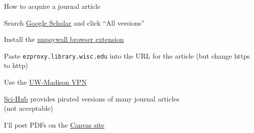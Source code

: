\documentclass[aspectratio=169,12pt,t]{beamer}
\begin{document}
\begin{frame}[c,fragile]{How to acquire a journal article}

  \bbi

\item Search \href{https://scholar.google.com}{Google Scholar} and click ``All \uline{\mbox{\hspace{2em}}} versions''

\item Install the
  \href{https://unpaywall.org/products/extension}{unpaywall browser extension}

\item Paste {\tt ezproxy.library.wisc.edu} into the URL for the
  article (but change https to http)

\item Use the
  \href{https://vpn.wisc.edu/}{UW-Madison VPN}

\item \href{https://sci-hub.se}{Sci-Hub} provides pirated versions of many
  journal articles \\
  ({\vhilit not} acceptable)

\item I'll post PDFs on the \href{https://canvas.wisc.edu/courses/323609}{Canvas site}

  \ei
\end{frame}
\end{document}
